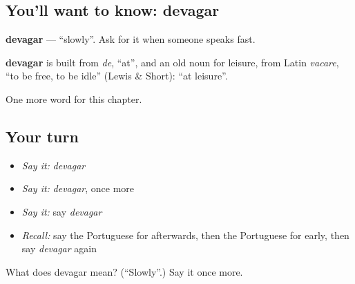 \subsection*{You'll want to know: devagar}
\textbf{devagar} — \textquotedblleft{}slowly\textquotedblright{}. Ask for it when someone speaks fast.

\begin{cousinweb}
\textbf{devagar} is built from \emph{de}, \textquotedblleft{}at\textquotedblright{}, and an old noun for leisure, from Latin \emph{vacare}, \textquotedblleft{}to be free, to be idle\textquotedblright{} (Lewis \& Short): \textquotedblleft{}at leisure\textquotedblright{}.
\end{cousinweb}

\begin{grammarlens}[title={What you've built}]
One more word for this chapter.
\end{grammarlens}

\subsection*{Your turn}
\begin{itemize}
\raggedright
  \item \emph{Say it:} \emph{devagar}
  \item \emph{Say it:} \emph{devagar}, once more
  \item \emph{Say it:} say \emph{devagar}
  \item \emph{Recall:} say the Portuguese for afterwards, then the Portuguese for early, then say \emph{devagar} again
\end{itemize}

\begin{tcolorbox}[breakable,colback=teal!4,colframe=teal!35!black,title={Before you move on}]
What does devagar mean? (\textquotedblleft{}Slowly\textquotedblright{}.) Say it once more.
\end{tcolorbox}
